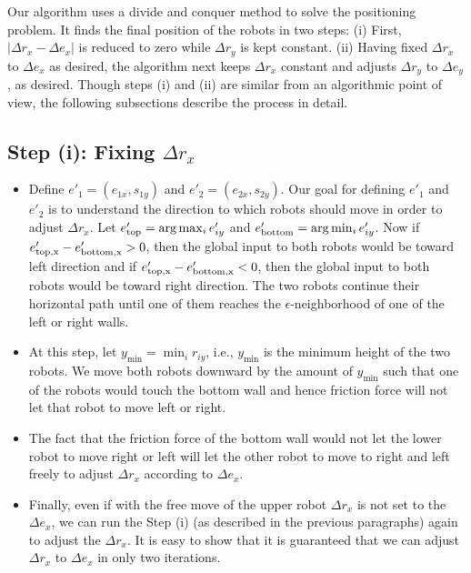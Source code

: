 Our algorithm uses a divide and conquer method to solve the positioning problem. 
It finds the final position of the robots in two steps: (i) First, $|\Delta r_x - \Delta e_x |$ is reduced to zero while  $\Delta r_y$ is kept constant. 
(ii) Having fixed $\Delta r_x$ to $\Delta e_x$ as desired, the  algorithm next keeps $\Delta r_x$ constant and adjusts $\Delta r_y$ to $\Delta e_y$, as desired. 
Though steps (i) and (ii) are similar from an algorithmic point of view, the following subsections describe the process in detail. 

\subsection{Step (i): Fixing $\Delta r_x$}
\label{theory:step1}
\begin{itemize}
\item Define $e'_1=(e_{1x},s_{1y})$ and $e'_2=(e_{2x},s_{2y})$. Our goal for defining $e'_1$ and $e'_2$ is to understand the direction to which robots should move in order to adjust $\Delta r_x$. Let $e'_{\rm{top}} = \arg \max_i e'_{iy}$ and $e'_{\rm{bottom}} = \arg \min_i e'_{iy}$. Now if $e'_{\rm{top},x}-e'_{\rm{bottom},x}>0$, then the global input to both robots would be toward left direction and if $e'_{\rm{top},x}-e'_{\rm{bottom},x}<0$, then the global input to both robots would be toward right direction. The two robots continue their horizontal path until one of them reaches the $\epsilon$-neighborhood of one of the left or right walls.
\item At this step, let $y_{\min} = \min_i r_{iy}$, i.e., $y_{\min}$ is the minimum height of the two robots. We move both robots downward by the amount of $y_{\min}$ such that one of the robots would touch the bottom wall and hence friction force will not let that robot to move left or right.
\item The fact that the friction force of the bottom wall would not let the lower robot to move right or left will let the other robot to move to right and left freely to adjust $\Delta r_x $ according to $\Delta e_x$.
\item Finally, even if with the free move of the upper robot $\Delta r_x$ is not set to the $\Delta e_x$, we can run the Step (i) (as described in the previous paragraphs) again to adjust the $\Delta r_x$. It is easy to show that it is guaranteed that we can adjust $\Delta r_x$ to $\Delta e_x$ in only two iterations.
\end{itemize}

